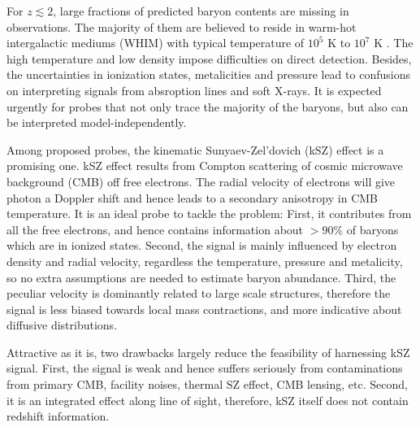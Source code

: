 For $z\lesssim 2$, large fractions of predicted baryon contents are missing in observations.  
The majority of them are believed to reside in warm-hot intergalactic mediums (WHIM) with typical temperature of $10^5$ K to $10^7$ K \cite{Pen1999,Soltan06}. 
The high temperature and low density impose difficulties on direct detection.  
Besides, the uncertainties in ionization states, metalicities and 
pressure  
lead to confusions on interpreting signals from absroption lines 
and soft X-rays. 
It is expected urgently for probes that not only trace the majority of the baryons, but also can be interpreted model-independently.

Among proposed probes, the kinematic Sunyaev-Zel'dovich (kSZ) effect \cite{Sunyaev72,Sunyaev80,Vishniac87} is a promising one.  
kSZ effect results from Compton scattering of cosmic microwave background (CMB) off free electrons. 
The radial velocity of electrons will give photon a Doppler shift 
and hence leads to a 
secondary anisotropy in CMB temperature.
It is an ideal probe to tackle the problem: 
First, it contributes from all 
the free electrons, 
and hence contains information about $>90\%$ of 
baryons which are in ionized states. 
%
Second, the signal is mainly influenced by electron density and radial velocity, 
regardless the temperature, pressure and metalicity,  
so no extra assumptions are needed to estimate baryon abundance.  
%
Third, the peculiar velocity is dominantly related to large scale structures, 
therefore the signal is less biased towards local mass contractions, 
and more indicative about diffusive distributions.  

Attractive as it is, two drawbacks largely reduce the feasibility of harnessing kSZ signal.  
First, the signal is weak 
and hence suffers seriously from contaminations 
from primary CMB, facility noises, 
thermal SZ effect, CMB lensing, etc.  
Second, it is an integrated effect along line of sight, therefore, kSZ itself does not contain redshift information.


